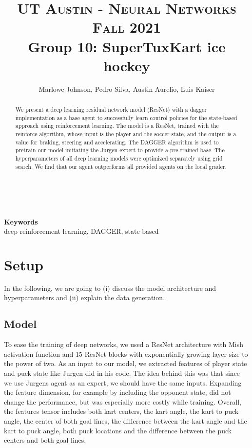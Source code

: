 \documentclass[10pt,twocolumn,letterpaper]{article}
\title{
		\usefont{OT1}{bch}{b}{n}
		\normalfont \normalsize \textsc{UT Austin - Neural Networks Fall 2021} \\ [10pt]
		\huge Group 10: SuperTuxKart ice hockey \\
}
\author{Marlowe Johnson, Pedro Silva, Austin Aurelio, Luis Kaiser}
\begin{document}
\maketitle

\begin{abstract}
We present a deep learning residual network model (ResNet) with a dagger implementation as a base agent to successfully learn control policies for the state-based approach using reinforcement learning. The model is a ResNet, trained with the reinforce algorithm, whose input is the player and the soccer state, and the output is a value for braking, steering and accelerating. The DAGGER algorithm is used to pretrain our model imitating the Jurgen expert to provide a pre-trained base. The hyperparameters of all deep learning models were optimized separately using grid search. We find that our agent outperforms all provided agents on the local grader.  
\end{abstract} \\ 
\\ 
{\textbf{Keywords} \\
deep reinforcement learning, DAGGER, state based}

\section{Setup}
In the following, we are going to (i) discuss the model architecture and hyperparameters and (ii) explain the data generation.

\subsection{Model}
To ease the training of deep networks, we used a ResNet architecture with Mish activation function and 15 ResNet blocks with exponentially growing layer size to the power of two. As an input to our model, we extracted features of player state and puck state like Jurgen did in his code. The idea behind this was that since we use Jurgens agent as an expert, we should have the same inputs. Expanding the feature dimension, for example by including the opponent state, did not change the performance, but was especially more costly while training. Overall, the features tensor includes both kart centers, the kart angle, the kart to puck angle, the center of both goal lines, the difference between the kart angle and the kart to puck angle, both puck locations and the difference between the puck centers and both goal lines.
\end{document}
